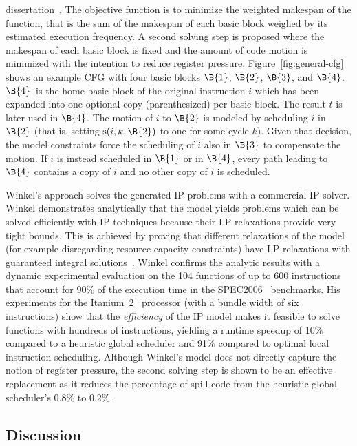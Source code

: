 \documentclass[acmsmall,authorversion,nonacm]{acmart}
\newcommand{\noMathVar}[2]{\operatorname{#1}(#2)}
\newcommand{\var}[2]{$\noMathVar{#1}{#2}$}
\begin{document}
dissertation~\cite[Chapter 6]{Winkel2004b}.
The objective function is to minimize the weighted makespan of the
function, that is the sum of the makespan of each basic block weighed
by its estimated execution frequency.
A second solving step is proposed where the makespan of each basic
block is fixed and the amount of code motion is minimized with the
intention to reduce register pressure.
Figure~\ref{fig:general-cfg} shows an example CFG with four basic
blocks $\B{1}$, $\B{2}$, $\B{3}$, and $\B{4}$.
$\B{4}$~is the home basic block of the original instruction $i$ which
has been expanded into one optional copy (parenthesized) per basic
block.
The result $t$ is later used in $\B{4}$.
The motion of $i$ to $\B{2}$ is modeled by scheduling $i$ in $\B{2}$
(that is, setting \var{s}{i,k,\B{2}} to one for some cycle $k$).
Given that decision, the model constraints force the scheduling of $i$
also in $\B{3}$ to compensate the motion.
If $i$ is instead scheduled in $\B{1}$ or in $\B{4}$, every path
leading to $\B{4}$ contains a copy of $i$ and no other copy of $i$ is
scheduled.

Winkel's approach solves the generated IP problems with a commercial
IP solver.
Winkel demonstrates analytically that the model yields problems which
can be solved efficiently with IP techniques because their LP
relaxations provide very tight bounds.
This is achieved by proving that different relaxations of the model
(for example disregarding resource capacity constraints) have LP
relaxations with guaranteed integral solutions~\cite[Chapter
  5]{Winkel2004b}.
Winkel confirms the analytic results with a dynamic experimental
evaluation on the 104 functions of up to 600 instructions that account
for 90\% of the execution time in the SPEC2006~\cite{CPU}
benchmarks.
His experiments for the Itanium~2~\cite{McNairy2003} processor (with a
bundle width of six instructions) show that the \emph{efficiency} of
the IP model makes it feasible to solve functions with hundreds of
instructions, yielding a runtime speedup of 10\% compared to a
heuristic global scheduler and 91\% compared to optimal local
instruction scheduling.
Although Winkel's model does not directly capture the notion of
register pressure, the second solving step is shown to be an effective
replacement as it reduces the percentage of spill code from the
heuristic global scheduler's 0.8\% to 0.2\%.


\subsection{Discussion}
\label{sec:instruction-scheduling-discussion}
\end{document}
